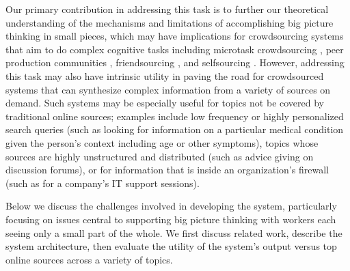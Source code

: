 Our primary contribution in addressing this task is to further our theoretical understanding of the mechanisms and limitations of accomplishing big picture thinking in small pieces, which may have implications for crowdsourcing systems that aim to do complex cognitive tasks including microtask crowdsourcing \cite{kittur2013future}, peer production communities \cite{kittur2008harnessing}, friendsourcing \cite{bernstein2010personalization}, and selfsourcing \cite{teevan2014selfsourcing}. However, addressing this task may also have intrinsic utility in paving the road for crowdsourced systems that can synthesize complex information from a variety of sources on demand. Such systems may be especially useful for topics not be covered by traditional online sources; examples include low frequency or highly personalized search queries (such as looking for information on a particular medical condition given the person's context including age or other symptoms), topics whose sources are highly unstructured and distributed (such as advice giving on discussion forums), or for information that is inside an organization's firewall (such as for a company's IT support sessions). 


Below we discuss the challenges involved in developing the system, particularly focusing on issues central to supporting big picture thinking with workers each seeing only a small part of the whole. We first discuss related work, describe the system architecture, then evaluate the utility of the system’s output versus top online sources across a variety of topics.



